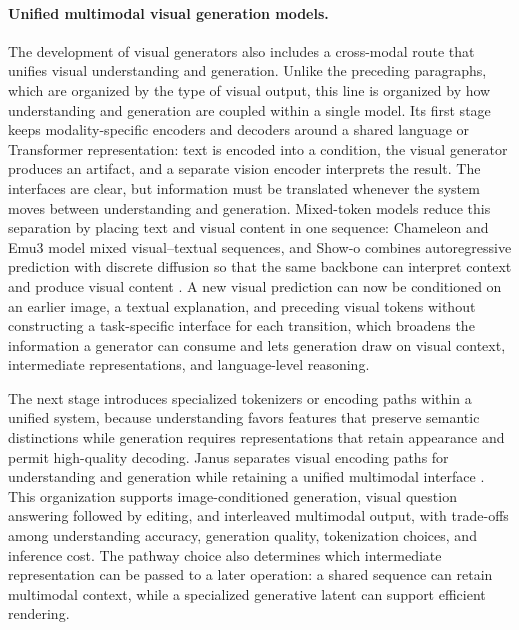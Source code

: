 \paragraph{Unified multimodal visual generation models.}
The development of visual generators also includes a cross-modal route that unifies visual understanding and generation. Unlike the preceding paragraphs, which are organized by the type of visual output, this line is organized by how understanding and generation are coupled within a single model. Its first stage keeps modality-specific encoders and decoders around a shared language or Transformer representation: text is encoded into a condition, the visual generator produces an artifact, and a separate vision encoder interprets the result. The interfaces are clear, but information must be translated whenever the system moves between understanding and generation. Mixed-token models reduce this separation by placing text and visual content in one sequence: Chameleon and Emu3 model mixed visual--textual sequences, and Show-o combines autoregressive prediction with discrete diffusion so that the same backbone can interpret context and produce visual content \cite{chameleon2024,emu32024,showo2024}. A new visual prediction can now be conditioned on an earlier image, a textual explanation, and preceding visual tokens without constructing a task-specific interface for each transition, which broadens the information a generator can consume and lets generation draw on visual context, intermediate representations, and language-level reasoning.

The next stage introduces specialized tokenizers or encoding paths within a unified system, because understanding favors features that preserve semantic distinctions while generation requires representations that retain appearance and permit high-quality decoding. Janus separates visual encoding paths for understanding and generation while retaining a unified multimodal interface \cite{janus2024}. This organization supports image-conditioned generation, visual question answering followed by editing, and interleaved multimodal output, with trade-offs among understanding accuracy, generation quality, tokenization choices, and inference cost. The pathway choice also determines which intermediate representation can be passed to a later operation: a shared sequence can retain multimodal context, while a specialized generative latent can support efficient rendering.

